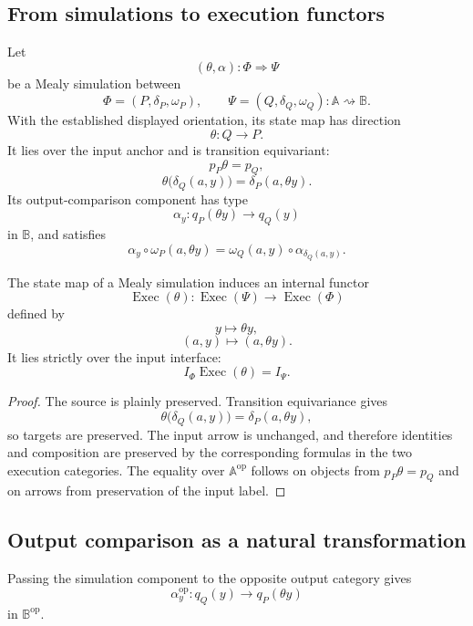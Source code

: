 \subsection{From simulations to execution functors}
\label{subsec:simulations-execution-functors}

Let
\[
    (\theta,\alpha):
    \Phi\Longrightarrow\Psi
\]
be a Mealy simulation between
\[
    \Phi=(P,\delta_P,\omega_P),
    \qquad
    \Psi=(Q,\delta_Q,\omega_Q):
    \mathbb A\rightsquigarrow\mathbb B.
\]
With the established displayed orientation, its state map has direction
\[
    \theta:Q\to P.
\]
It lies over the input anchor and is transition equivariant:
\[
    p_P\theta=p_Q,
\]
\[
    \theta\bigl(\delta_Q(a,y)\bigr)
    =
    \delta_P(a,\theta y).
\]
Its output-comparison component has type
\[
    \alpha_y:
    q_P(\theta y)
    \longrightarrow
    q_Q(y)
\]
in \(\mathbb B\), and satisfies
\[
    \alpha_y
    \circ
    \omega_P(a,\theta y)
    =
    \omega_Q(a,y)
    \circ
    \alpha_{\delta_Q(a,y)}.
\]

\begin{proposition}
\label{prop:execution-functor-simulation}
The state map of a Mealy simulation induces an internal functor
\[
    \operatorname{Exec}(\theta):
    \operatorname{Exec}(\Psi)
    \longrightarrow
    \operatorname{Exec}(\Phi)
\]
defined by
\[
    y\longmapsto\theta y,
\]
\[
    (a,y)\longmapsto(a,\theta y).
\]
It lies strictly over the input interface:
\[
    I_\Phi\operatorname{Exec}(\theta)=I_\Psi.
\]
\end{proposition}

\begin{proof}
The source is plainly preserved. Transition equivariance gives
\[
    \theta\bigl(\delta_Q(a,y)\bigr)
    =
    \delta_P(a,\theta y),
\]
so targets are preserved. The input arrow is unchanged, and therefore
identities and composition are preserved by the corresponding formulas in
the two execution categories. The equality over
\(\mathbb A^{\mathrm{op}}\) follows on objects from
\(p_P\theta=p_Q\) and on arrows from preservation of the input label.
\end{proof}

\subsection{Output comparison as a natural transformation}
\label{subsec:simulation-output-natural-transformation}

Passing the simulation component to the opposite output category gives
\[
    \alpha_y^{\mathrm{op}}:
    q_Q(y)
    \longrightarrow
    q_P(\theta y)
\]
in \(\mathbb B^{\mathrm{op}}\).

